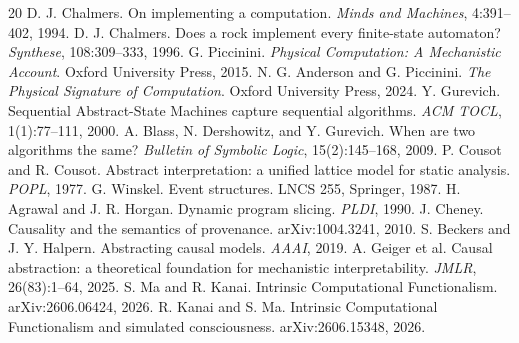 \documentclass[11pt,a4paper]{article}
\theoremstyle{clean}
\theoremstyle{definition}
\begin{document}
\renewcommand{\refname}{Selected references}
\begin{thebibliography}{20}
\small
\RaggedRight
{}
 D. J. Chalmers. On implementing a computation. \emph{Minds and Machines}, 4:391--402, 1994.
 D. J. Chalmers. Does a rock implement every finite-state automaton? \emph{Synthese}, 108:309--333, 1996.
 G. Piccinini. \emph{Physical Computation: A Mechanistic Account}. Oxford University Press, 2015.
 N. G. Anderson and G. Piccinini. \emph{The Physical Signature of Computation}. Oxford University Press, 2024.
 Y. Gurevich. Sequential Abstract-State Machines capture sequential algorithms. \emph{ACM TOCL}, 1(1):77--111, 2000.
 A. Blass, N. Dershowitz, and Y. Gurevich. When are two algorithms the same? \emph{Bulletin of Symbolic Logic}, 15(2):145--168, 2009.
 P. Cousot and R. Cousot. Abstract interpretation: a unified lattice model for static analysis. \emph{POPL}, 1977.
 G. Winskel. Event structures. LNCS 255, Springer, 1987.
 H. Agrawal and J. R. Horgan. Dynamic program slicing. \emph{PLDI}, 1990.
 J. Cheney. Causality and the semantics of provenance. arXiv:1004.3241, 2010.
 S. Beckers and J. Y. Halpern. Abstracting causal models. \emph{AAAI}, 2019.
 A. Geiger et al. Causal abstraction: a theoretical foundation for mechanistic interpretability. \emph{JMLR}, 26(83):1--64, 2025.
 S. Ma and R. Kanai. Intrinsic Computational Functionalism. arXiv:2606.06424, 2026.
 R. Kanai and S. Ma. Intrinsic Computational Functionalism and simulated consciousness. arXiv:2606.15348, 2026.
\end{thebibliography}
\end{document}
